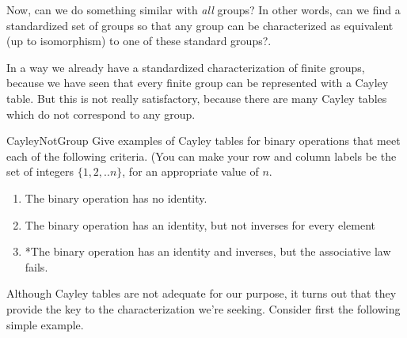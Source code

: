 Now, can we do something similar with \emph{all} 
groups? In other words, can we find  a standardized set of groups so that any group can be characterized as equivalent (up to isomorphism)  to one of these standard groups?. 

In a way we already have a standardized characterization of finite groups, because we have seen that every finite group can be represented with a Cayley table.  But this is not really satisfactory, because there are many Cayley tables which do not correspond to any group.

\begin{exercise}{CayleyNotGroup}
Give examples of Cayley tables for binary operations that meet each of the following criteria.  (You can make your row and column labels be the set of integers $\{1,2,..n\}$, for an appropriate value of $n$.
\begin{enumerate}
\item
The binary operation has no identity.
\item
The binary operation has an identity, but not inverses for every element
\item
*The binary operation has an identity and inverses, but  the associative law fails.
\end{enumerate}
\end{exercise} 

Although Cayley tables are not adequate for our purpose, it turns out that they provide the key to the characterization we're seeking. Consider first the following simple example.


